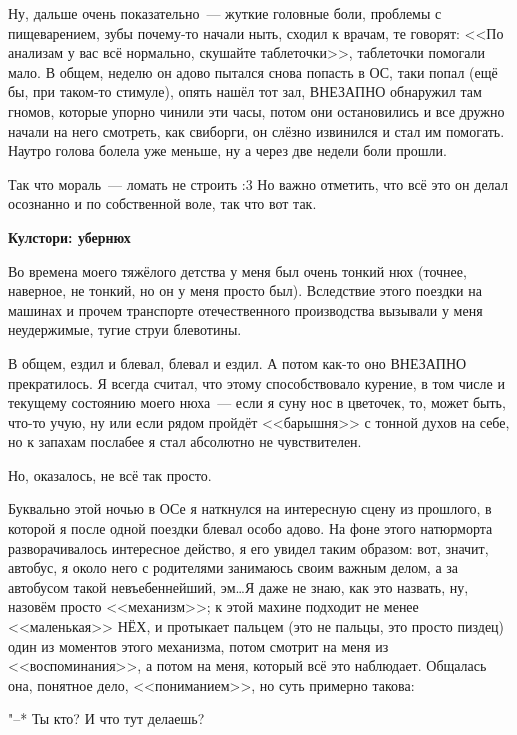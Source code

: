 \documentclass[a4paper,14pt,oneside]{memoir}
\begin{document}
Ну, дальше очень показательно~--- жуткие головные боли, проблемы с пищеварением, зубы почему-то начали ныть, сходил к врачам, те говорят: <<По анализам у вас всё нормально, скушайте таблеточки>>, таблеточки помогали мало. В общем, неделю он адово пытался снова попасть в ОС, таки попал (ещё бы, при таком-то стимуле), опять нашёл тот зал, ВНЕЗАПНО обнаружил там гномов, которые упорно чинили эти часы, потом они остановились и все дружно начали на него смотреть, как свиборги, он слёзно извинился и стал им помогать. Наутро голова болела уже меньше, ну а через две недели боли прошли.

Так что мораль~--- ломать не строить :3 Но важно отметить, что всё это он делал осознанно и по собственной воле, так что вот так.

\begin{shaded}

\begin{center}
\Large\textbf{Кулстори: убернюх}
\end{center}


Во времена моего тяжёлого детства у меня был очень тонкий нюх (точнее, наверное, не тонкий, но он у меня просто был). Вследствие этого поездки на машинах и прочем транспорте отечественного производства вызывали у меня неудержимые, тугие струи блевотины.

В общем, ездил и блевал, блевал и ездил. А потом как-то оно ВНЕЗАПНО прекратилось. Я всегда считал, что этому способствовало курение, в том числе и текущему состоянию моего нюха~--- если я суну нос в цветочек, то, может быть, что-то учую, ну или если рядом пройдёт <<барышня>> с тонной духов на себе, но к запахам послабее я стал абсолютно не чувствителен.

Но, оказалось, не всё так просто.

Буквально этой ночью в ОСе я наткнулся на интересную сцену из прошлого, в которой я после одной поездки блевал особо адово. На фоне этого натюрморта разворачивалось интересное действо, я его увидел таким образом: вот, значит, автобус, я около него с родителями занимаюсь своим важным делом, а за автобусом такой невъебеннейший, эм\ldots Я даже не знаю, как это назвать, ну, назовём просто <<механизм>>; к этой махине подходит не менее <<маленькая>> НЁХ, и протыкает пальцем (это не пальцы, это просто пиздец) один из моментов этого механизма, потом смотрит на меня из <<воспоминания>>, а потом на меня, который всё это наблюдает. Общалась она, понятное дело, <<пониманием>>, но суть примерно такова:

"--* Ты кто? И что тут делаешь?


\end{shaded}
\end{document}

